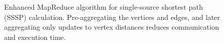 \begin{figure}[htb]
\begin{center}
{\begin{minipage}{\textwidth}
\begin{tabbing}
  \end{tabbing}
 \end{minipage}}\end{center}

 \caption{Enhanced MapReduce algorithm for single-source shortest path (SSSP)
 calculation.  Pre-aggregating the vertices and edges, and later aggregating only updates to vertex distances reduces communication and execution time.}

 \label{fig:sssp2}
\end{figure}

